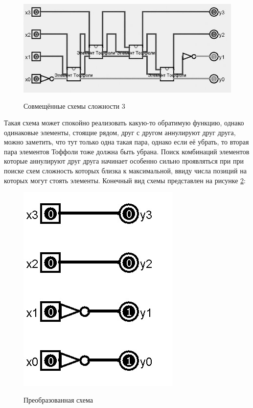 \documentclass[14pt]{extarticle} %
\begin{document}
\begin{figure}[h]
	\centering
	\caption{Совмещённые схемы сложности 3}
	\includegraphics[scale=0.5]{img/modifed 2.jpg}
	\label{circuit_amal32}
\end{figure}
Такая схема может спокойно реализовать какую-то обратимую функцию, однако одинаковые элементы, стоящие рядом, друг с другом аннулируют друг друга, можно заметить, что тут только одна такая пара, однако если её убрать, то вторая пара элементов Тоффоли тоже должна быть убрана. Поиск комбинаций элементов которые аннулируют друг друга начинает особенно сильно проявляться при при поиске схем сложность которых близка к максимальной, ввиду числа позиций на которых могут стоять элементы. Конечный вид схемы представлен на рисунке \ref{circuit_amalW3}:


\begin{figure}[h]
	\centering
	\caption{Преобразованная схема}
	\includegraphics[scale=0.4]{img/cutted.jpg}
	\label{circuit_amalW3}
\end{figure}
\end{document}
